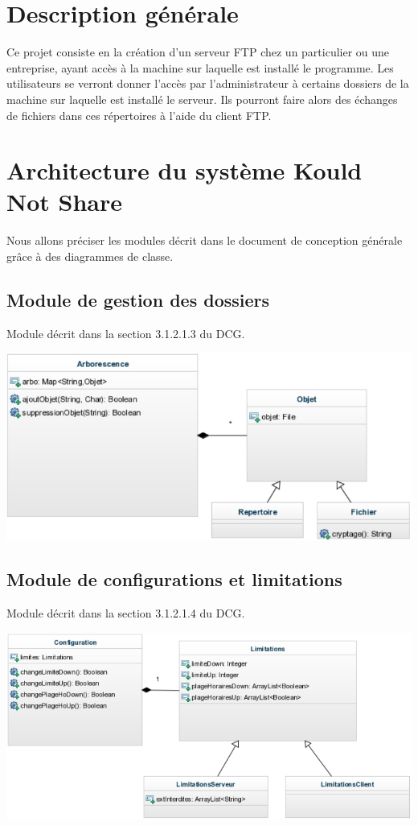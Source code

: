 \documentclass[10pt,a4paper]{report}
\begin{document}
\section{Description générale}

Ce projet consiste en la création d'un serveur FTP chez un particulier ou une entreprise, ayant accès à la machine sur laquelle est installé le programme. Les utilisateurs se verront donner l'accès par l'administrateur à certains dossiers de la machine sur laquelle est installé le serveur. Ils pourront faire alors des échanges de fichiers dans ces répertoires à l'aide du client FTP.\\

\newpage

\section{Architecture du système Kould Not Share}
Nous allons préciser les modules décrit dans le document de conception générale grâce à des diagrammes de classe.
\subsection{Module de gestion des dossiers}
Module décrit dans la section 3.1.2.1.3 du DCG.
\begin{center}
	\includegraphics[scale=0.5]{./Ressources/modules_doss.png}\\
\end{center}

\subsection{Module de configurations et limitations}
Module décrit dans la section 3.1.2.1.4 du DCG.
\begin{center}
	\includegraphics[scale=0.5]{./Ressources/modules_lim.png}\\
\end{center}
\end{document}
